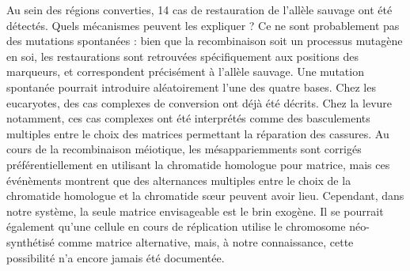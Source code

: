 \afterpage{\blankpage}

Au sein des régions converties, 14 cas de restauration de l'allèle sauvage ont
été détectés. Quels mécanismes peuvent les expliquer ? Ce ne sont probablement
pas des mutations spontanées : bien que la recombinaison soit un processus
mutagène en soi\cite{rodgers_error-prone_2016,hicks_increased_2010}, les
restaurations sont retrouvées spécifiquement aux positions des marqueurs, et
correspondent précisément à l'allèle sauvage. Une mutation spontanée pourrait
introduire aléatoirement l'une des quatre bases. Chez les eucaryotes, des cas
complexes de conversion ont déjà été
décrits\cite{martini_genome-wide_2011,yeadon_recombination_2001}. Chez la
levure notamment, ces cas complexes ont été interprétés comme des basculements multiples
entre le choix des matrices permettant la réparation des
cassures\cite{hoffmann_trans_2005}. Au cours de la recombinaison méiotique, les
mésappariemments sont corrigés préférentiellement en utilisant la chromatide
homologue pour matrice, mais ces événèments montrent que des alternances
multiples entre le choix de la chromatide homologue et la chromatide sœur
peuvent avoir lieu. Cependant, dans notre système, la seule matrice envisageable
est le brin exogène. Il se pourrait également qu'une cellule en cours de
réplication utilise le chromosome néo-synthétisé comme matrice alternative,
mais, à notre connaissance, cette possibilité n'a encore jamais été documentée.

